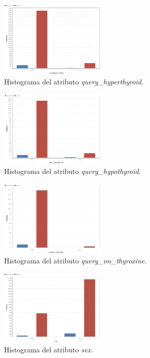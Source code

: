 \documentclass[osajnl,twocolumn,showpacs,superscriptaddress,10pt,floatfix]{revtex4-1} %
\begin{document}
\begin{figure}[H]
    \centering
    \includegraphics[width=0.45\textwidth]{analysis/histogram_query_hyperthyroid}
    \caption{Histograma del atributo \textit{query\_hyperthyroid}.}
    \label{figure:query_hyperthyroid}
\end{figure}

\begin{figure}[H]
    \centering
    \includegraphics[width=0.45\textwidth]{analysis/histogram_query_hypothyroid}
    \caption{Histograma del atributo \textit{query\_hypothyroid}.}
    \label{figure:query_hypothyroid}
\end{figure}

\begin{figure}[H]
    \centering
    \includegraphics[width=0.45\textwidth]{analysis/histogram_query_on_thyroxine}
    \caption{Histograma del atributo \textit{query\_on\_thyroxine}.}
    \label{figure:query_on_thyroxine}
\end{figure}

\begin{figure}[H]
    \centering
    \includegraphics[width=0.45\textwidth]{analysis/histogram_sex}
    \caption{Histograma del atributo \textit{sex}.}
    \label{figure:sex}
\end{figure}
\end{document}
